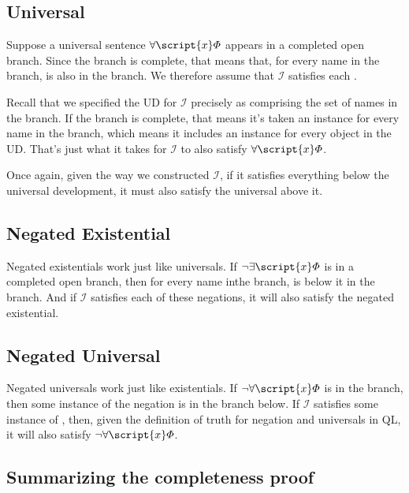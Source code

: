 \subsection{Universal}

Suppose a universal sentence $\forall \script{x} \metaA{}$ appears in a completed open branch. Since the branch is complete, that means that, for every name  in the branch, \mbox{\metaA{}} is also in the branch. We therefore assume that $\mathcal{I}$ satisfies each \metaA{}.

Recall that we specified the UD for $\mathcal{I}$ precisely as comprising the set of names in the branch. If the branch is complete, that means it's taken an instance for every name in the branch, which means it includes an instance for every object in the UD. That's just what it takes for $\mathcal{I}$ to also satisfy $\forall \script{x} \metaA{}$.

Once again, given the way we constructed $\mathcal{I}$, if it satisfies everything below the universal development, it must also satisfy the universal above it.

\subsection{Negated Existential}

Negated existentials work just like universals. If $\enot \exists \script{x} \metaA{}$ is in a completed open branch, then for every name  inthe branch, 
\mbox{\enot\metaA{}} is below it in the branch. And if $\mathcal{I}$ satisfies each of these negations, it will also satisfy the negated existential.

\subsection{Negated Universal}

Negated universals work just like existentials. If $\enot \forall \script{x} \metaA{}$ is in the branch, then some instance of the negation \enot \metaA{} is in the branch below. If $\mathcal{I}$ satisfies some instance of \enot \metaA{}, then, given the definition of truth for negation and universals in QL, it will also satisfy $\enot \forall \script{x} \metaA{}$.

\subsection{Summarizing the completeness proof}

